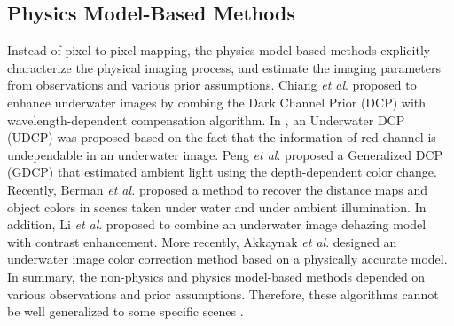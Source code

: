 \documentclass[journal]{IEEEtran}
\begin{document}
\subsection{Physics Model-Based Methods}
Instead of pixel-to-pixel mapping, the physics model-based methods explicitly characterize the physical imaging process, and estimate the imaging parameters from observations and various prior assumptions\cite{he2010single,chiang2011underwater,UDCP,GDCP,Histogram-prior,akkaynak2019sea,serikawa2014underwater}.
Chiang \textit{et al}. \cite{chiang2011underwater} proposed to enhance underwater images by combing the Dark Channel Prior (DCP) \cite{he2010single} with wavelength-dependent compensation algorithm. In \cite{UDCP}, an Underwater DCP (UDCP) was proposed based on the
fact that the information of red channel is undependable in an underwater image. Peng \textit{et al}. \cite{GDCP} proposed a Generalized DCP (GDCP) that estimated ambient light using the depth-dependent color change. Recently, Berman \textit{et al.} \cite{berman2020underwater} proposed a method to recover the distance maps and object colors in scenes taken under water and under ambient illumination. In addition, Li \textit{et al}. \cite{Histogram-prior} proposed to combine an underwater image dehazing model with contrast enhancement. More recently, Akkaynak \textit{et al}. \cite{akkaynak2019sea} designed an underwater image color correction method based on a physically accurate model. In summary, the non-physics and physics model-based methods depended on various observations and prior assumptions.
 Therefore, these algorithms cannot be well generalized to some specific scenes \cite{GDCP}.
\end{document}
